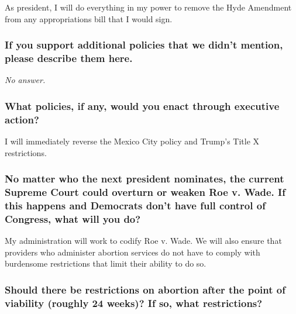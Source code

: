As president, I will do everything in my power to remove the Hyde
Amendment from any appropriations bill that I would sign.

\hypertarget{if-you-support-additional-policies-that-we-didnt-mention-please-describe-them-here}{%
\subsubsection{If you support additional policies that we didn't
mention, please describe them
here.}\label{if-you-support-additional-policies-that-we-didnt-mention-please-describe-them-here}}

\emph{No answer.}

\hypertarget{what-policies-if-any-would-you-enact-through-executive-action}{%
\subsubsection{What policies, if any, would you enact through executive
action?}\label{what-policies-if-any-would-you-enact-through-executive-action}}

I will immediately reverse the Mexico City policy and Trump's Title X
restrictions.

\hypertarget{no-matter-who-the-next-president-nominates-the-current-supreme-court-could-overturn-or-weaken-roe-v-wade-if-this-happens-and-democrats-dont-have-full-control-of-congress-what-will-you-do}{%
\subsubsection{No matter who the next president nominates, the current
Supreme Court could overturn or weaken Roe v. Wade. If this happens and
Democrats don't have full control of Congress, what will you
do?}\label{no-matter-who-the-next-president-nominates-the-current-supreme-court-could-overturn-or-weaken-roe-v-wade-if-this-happens-and-democrats-dont-have-full-control-of-congress-what-will-you-do}}

My administration will work to codify Roe v. Wade. We will also ensure
that providers who administer abortion services do not have to comply
with burdensome restrictions that limit their ability to do so.

\hypertarget{should-there-be-restrictions-on-abortion-after-the-point-of-viability-roughly-24-weeks-if-so-what-restrictions}{%
\subsubsection{Should there be restrictions on abortion after the point
of viability (roughly 24 weeks)? If so, what
restrictions?}\label{should-there-be-restrictions-on-abortion-after-the-point-of-viability-roughly-24-weeks-if-so-what-restrictions}}


